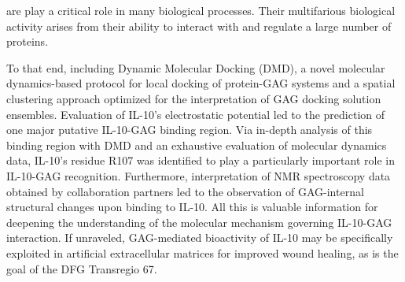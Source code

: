 are play a critical role in many biological processes.
Their multifarious biological activity arises from their ability to interact
with and regulate a large number of proteins.

  To that end, including Dynamic Molecular Docking
(DMD), a novel molecular dynamics-based protocol for local docking of
protein-GAG systems and a spatial clustering approach optimized for the
interpretation of GAG docking solution ensembles. Evaluation of IL-10's
electrostatic potential led to the prediction of one major putative IL-10-GAG
binding region. Via in-depth analysis of this binding region with DMD and an
exhaustive evaluation of molecular dynamics data, IL-10's residue R107 was
identified to play a particularly important role in IL-10-GAG recognition.
Furthermore, interpretation of NMR spectroscopy data obtained by collaboration
partners led to the observation of GAG-internal structural changes upon binding
to IL-10. All this is valuable information for deepening the understanding of
the molecular mechanism governing IL-10-GAG interaction. If unraveled,
GAG-mediated bioactivity of IL-10 may be specifically exploited in artificial
extracellular matrices for improved wound healing, as is the goal of the DFG
Transregio 67.

\lipsum[1-4]